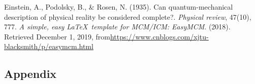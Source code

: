\documentclass[12pt]{article}  %
\begin{document}
\begin{thebibliography}{99}
 Einstein, A., Podolsky, B., \& Rosen, N. (1935). Can quantum-mechanical description of physical reality be considered complete?. \emph{Physical review}, 47(10), 777.
 \emph{A simple, easy \LaTeX\ template for MCM/ICM: EasyMCM}. (2018). Retrieved December 1, 2019, from\url{https://www.cnblogs.com/xjtu-blacksmith/p/easymcm.html}
\end{thebibliography}


\begin{subappendices}  %
\section{Appendix}


\end{subappendices}  %
\end{document}
